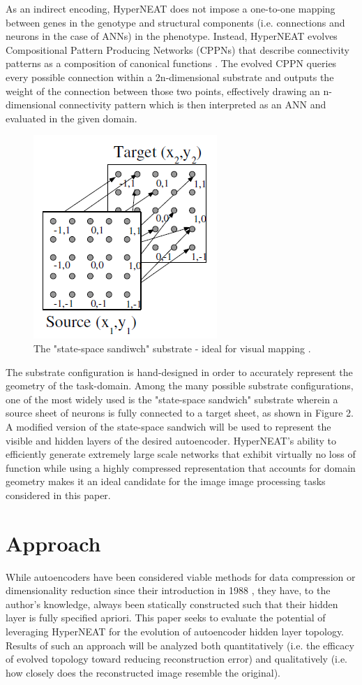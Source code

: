 \documentclass{acm_proc_article-sp}
\begin{document}
As an indirect encoding, HyperNEAT does not impose a one-to-one mapping between genes in the genotype and structural components (i.e. connections and neurons in the case of ANNs) in the phenotype. Instead, HyperNEAT evolves Compositional Pattern Producing Networks (CPPNs) that describe connectivity patterns as a composition of canonical functions \cite{Author}.  The evolved CPPN queries every possible connection within a 2n-dimensional substrate and outputs the weight of the connection between those two points, effectively drawing an n-dimensional connectivity pattern which is then interpreted as an ANN and evaluated in the given domain.

\begin{figure}[h]
\caption{The "state-space sandiwch" substrate - ideal for visual mapping \cite{Author}.}
\centering
\includegraphics[scale=0.8]{StateSpaceSandwichSubstrate}
\end{figure}

The substrate configuration is hand-designed in order to accurately represent the geometry of the task-domain.  Among the many possible substrate configurations, one of the most widely used is the "state-space sandwich" substrate wherein a source sheet of neurons is fully connected to a target sheet, as shown in Figure 2.  A modified version of the state-space sandwich will be used to represent the visible and hidden layers of the desired autoencoder.  HyperNEAT’s ability to efficiently generate extremely large scale networks that exhibit virtually no loss of function while using a highly compressed representation that accounts for domain geometry makes it an ideal candidate for the image image processing tasks considered in this paper.

\section{Approach}
While autoencoders have been considered viable methods for data compression or dimensionality reduction since their introduction in 1988 \cite{Author}, they have, to the author’s knowledge, always been statically constructed such that their hidden layer is fully specified apriori.  This paper seeks to evaluate the potential of leveraging HyperNEAT for the evolution of autoencoder hidden layer topology.  Results of such an approach will be analyzed both quantitatively (i.e. the efficacy of evolved topology toward reducing reconstruction error) and qualitatively (i.e. how closely does the reconstructed image resemble the original).
\end{document}
